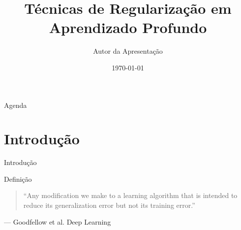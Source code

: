 \documentclass{beamer}
\title{Técnicas de Regularização em Aprendizado Profundo}
\author{Autor da Apresentação}
\date{\today}
\institute
{
  Universidade Federal do Rio de Janeiro\\
  UFRJ/COPPE/PEE
}
\begin{document}
{
\begin{frame}
  \bigskip\bigskip\bigskip\bigskip
  \titlepage
\end{frame}
}

\begin{frame}{Agenda}
  \tableofcontents
\end{frame}

\section{Introdução}

\begin{frame}{Introdução}
\end{frame}

\begin{frame}{Definição}
\begin{quote}
``Any modification we make to a learning algorithm that is intended to reduce its generalization error but not its training error.''
\end{quote}
\vspace{0.5cm}
\raggedleft
--- Goodfellow et al. Deep Learning
\end{frame}
\end{document}
